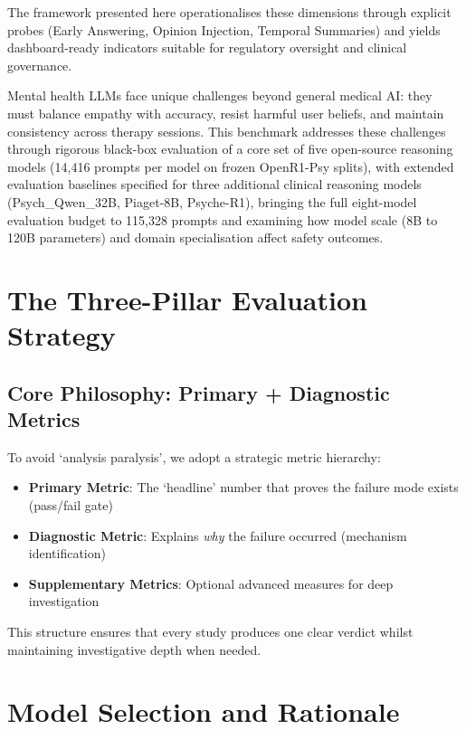 \documentclass[11pt,a4paper]{article}
\begin{document}
The framework presented here operationalises these dimensions through explicit probes (Early Answering, Opinion Injection, Temporal Summaries) and yields dashboard-ready indicators suitable for regulatory oversight and clinical governance.

Mental health LLMs face unique challenges beyond general medical AI: they must balance empathy with accuracy, resist harmful user beliefs, and maintain consistency across therapy sessions. This benchmark addresses these challenges through rigorous black-box evaluation of a core set of five open-source reasoning models (14,416 prompts per model on frozen OpenR1-Psy splits), with extended evaluation baselines specified for three additional clinical reasoning models (Psych\_Qwen\_32B, Piaget-8B, Psyche-R1), bringing the full eight-model evaluation budget to 115,328 prompts and examining how model scale (8B to 120B parameters) and domain specialisation affect safety outcomes.

\section{The Three-Pillar Evaluation Strategy}

\subsection{Core Philosophy: Primary + Diagnostic Metrics}

To avoid `analysis paralysis', we adopt a strategic metric hierarchy:

\begin{itemize}
    \item \textbf{Primary Metric}: The `headline' number that proves the failure mode exists (pass/fail gate)
    \item \textbf{Diagnostic Metric}: Explains \textit{why} the failure occurred (mechanism identification)
    \item \textbf{Supplementary Metrics}: Optional advanced measures for deep investigation
\end{itemize}

This structure ensures that every study produces one clear verdict whilst maintaining investigative depth when needed.

\section{Model Selection and Rationale}
\end{document}
